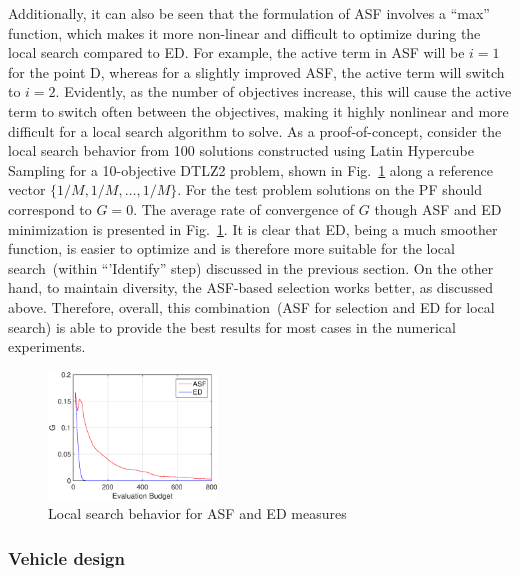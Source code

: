 \documentclass[twocolumn,10pt]{asme2ej}
\begin{document}
Additionally, it can also be seen that the formulation of ASF involves a ``max'' function, which makes it more non-linear and difficult to optimize during the local search compared to ED. For example, the active term in ASF will be $i=1$ for the point D, whereas for a slightly improved ASF, the active term will switch to $i=2$. Evidently, as the number of objectives increase, this will cause the active term to switch often between the objectives, making it highly nonlinear and more difficult for a local search algorithm to solve. As a proof-of-concept, consider the local search behavior from 100 solutions constructed using Latin Hypercube Sampling for a 10-objective DTLZ2 problem, shown in Fig.~\ref{fig:asfedls} along a reference vector $\{1/M, 1/M, \ldots, 1/M\}$. For the test problem solutions on the PF should correspond to $G=0$. The average rate of convergence of $G$ though ASF and ED minimization is presented in Fig.~\ref{fig:asfedls}. It is clear that ED, being a much smoother function, is easier to optimize and is therefore more suitable for the local search~(within ``'Identify'' step) discussed in the previous section. On the other hand, to maintain diversity, the ASF-based selection works better, as discussed above. Therefore, overall, this combination~(ASF for selection and ED for local search) is able to provide the best results for most cases in the numerical experiments.     

\begin{figure}[!htb]
	\centering    
	\includegraphics[width = 0.40\textwidth]{figures/dtlz2asfed-10obj.eps}   
	\caption{Local search behavior for ASF and ED measures}
	\label{fig:asfedls}
\end{figure}


\subsubsection{{\color{blue}Vehicle design}}
\label{subsubsec:KHTsubsubsec:3}
\end{document}
